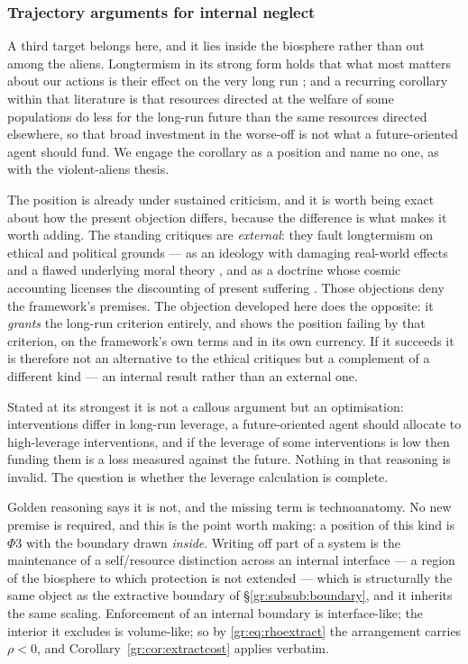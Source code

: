 \documentclass[11pt]{article}
\numberwithin{equation}{section}
\theoremstyle{plain}
\theoremstyle{definition}
\theoremstyle{remark}
\begin{document}
\subsubsection{Trajectory arguments for internal neglect}
\label{gr:subsub:neglect}

A third target belongs here, and it lies inside the biosphere rather
than out among the aliens. Longtermism in its strong form holds that
what most matters about our actions is their effect on the very long
run \cite{GM21}; and a recurring corollary within that literature is
that resources directed at the welfare of some populations do less for
the long-run future than the same resources directed elsewhere, so that
broad investment in the worse-off is not what a future-oriented agent
should fund. We engage the corollary as a position and name no one, as
with the violent-aliens thesis.

The position is already under sustained criticism, and it is worth being
exact about how the present objection differs, because the difference is
what makes it worth adding. The standing critiques are \emph{external}:
they fault longtermism on ethical and political grounds --- as an
ideology with damaging real-world effects and a flawed underlying moral
theory \cite{Crary23}, and as a doctrine whose cosmic accounting
licenses the discounting of present suffering \cite{Torres21}. Those
objections deny the framework's premises. The objection developed here
does the opposite: it \emph{grants} the long-run criterion entirely, and
shows the position failing by that criterion, on the framework's own
terms and in its own currency. If it succeeds it is therefore not an
alternative to the ethical critiques but a complement of a different
kind --- an internal result rather than an external one.

Stated at its strongest it is not a callous argument but an
optimisation: interventions differ in long-run leverage, a
future-oriented agent should allocate to high-leverage interventions,
and if the leverage of some interventions is low then funding them is a
loss measured against the future. Nothing in that reasoning is invalid.
The question is whether the leverage calculation is complete.

Golden reasoning says it is not, and the missing term is technoanatomy.
No new premise is required, and this is the point worth making: a
position of this kind is $\Phi3$ with the boundary drawn \emph{inside}.
Writing off part of a system is the maintenance of a self/resource
distinction across an internal interface --- a region of the biosphere
to which protection is not extended --- which is structurally the same
object as the extractive boundary of \S\ref{gr:subsub:boundary}, and it
inherits the same scaling. Enforcement of an internal boundary is
interface-like; the interior it excludes is volume-like; so by
\eqref{gr:eq:rhoextract} the arrangement carries $\rho<0$, and
Corollary~\ref{gr:cor:extractcost} applies verbatim.
\end{document}
